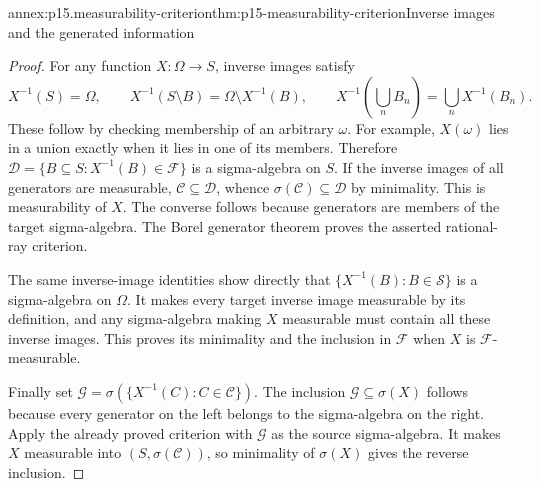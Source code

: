 \begin{annexitem}{annex:p15.measurability-criterion}{thm:p15-measurability-criterion}{Inverse images and the generated information}
\begin{proof}
For any function \(X:\Omega\to S\), inverse images satisfy
\[
 X^{-1}(S)=\Omega,\qquad
 X^{-1}(S\setminus B)=\Omega\setminus X^{-1}(B),\qquad
 X^{-1}\left(\bigcup_n B_n\right)=\bigcup_n X^{-1}(B_n).
\]
These follow by checking membership of an arbitrary \(\omega\).
For example, \(X(\omega)\) lies in a union exactly when it lies in
one of its members. Therefore
\(\mathcal D=\{B\subseteq S:X^{-1}(B)\in\mathcal F\}\)
is a sigma-algebra on \(S\). If the inverse images of all generators
are measurable, \(\mathcal C\subseteq\mathcal D\), whence
\(\sigma(\mathcal C)\subseteq\mathcal D\) by minimality. This
is measurability of \(X\). The converse follows because generators
are members of the target sigma-algebra. The Borel generator theorem
proves the asserted rational-ray criterion.

The same inverse-image identities show directly that
\(\{X^{-1}(B):B\in\mathcal S\}\) is a sigma-algebra on
\(\Omega\). It makes every target inverse image measurable by its
definition, and any sigma-algebra making \(X\) measurable must contain
all these inverse images. This proves its minimality and the inclusion
in \(\mathcal F\) when \(X\) is \(\mathcal F\)-measurable.

Finally set
\(\mathcal G=\sigma(\{X^{-1}(C):C\in\mathcal C\})\).
The inclusion \(\mathcal G\subseteq\sigma(X)\) follows because
every generator on the left belongs to the sigma-algebra on the right.
Apply the already proved criterion with \(\mathcal G\) as the
source sigma-algebra. It makes \(X\) measurable into
\((S,\sigma(\mathcal C))\), so minimality of \(\sigma(X)\)
gives the reverse inclusion.
\end{proof}
\end{annexitem}

